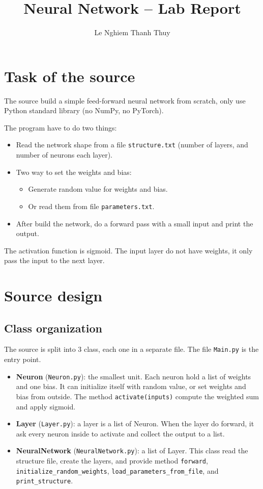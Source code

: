 \documentclass[12pt,a4paper]{article}
\title{Neural Network -- Lab Report}
\author{Le Nghiem Thanh Thuy}
\date{}
\begin{document}
\maketitle

\section{Task of the source}

The source build a simple feed-forward neural network from scratch, only use Python standard library (no NumPy, no PyTorch).

The program have to do two things:
\begin{itemize}
    \item Read the network shape from a file \texttt{structure.txt} (number of layers, and number of neurons each layer).
    \item Two way to set the weights and bias:
    \begin{itemize}
        \item Generate random value for weights and bias.
        \item Or read them from file \texttt{parameters.txt}.
    \end{itemize}
    \item After build the network, do a forward pass with a small input and print the output.
\end{itemize}

The activation function is sigmoid. The input layer do not have weights, it only pass the input to the next layer.

\section{Source design}

\subsection{Class organization}

The source is split into 3 class, each one in a separate file. The file \texttt{Main.py} is the entry point.

\begin{itemize}
    \item \textbf{Neuron} (\texttt{Neuron.py}): the smallest unit. Each neuron hold a list of weights and one bias. It can initialize itself with random value, or set weights and bias from outside. The method \texttt{activate(inputs)} compute the weighted sum and apply sigmoid.
    \item \textbf{Layer} (\texttt{Layer.py}): a layer is a list of Neuron. When the layer do forward, it ask every neuron inside to activate and collect the output to a list.
    \item \textbf{NeuralNetwork} (\texttt{NeuralNetwork.py}): a list of Layer. This class read the structure file, create the layers, and provide method \texttt{forward}, \texttt{initialize\_random\_weights}, \texttt{load\_parameters\_from\_file}, and \texttt{print\_structure}.
\end{itemize}
\end{document}
